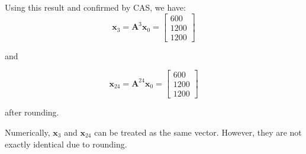\documentclass[12pt,a4paper]{article}
\begin{document}
\begin{solution}
Using this result and confirmed by CAS, we have:
\[
\mathbf{x}_3 = 
\mathbf{A}^3 \mathbf{x}_0 =  
\begin{bmatrix}
600 \\
1200 \\
1200
\end{bmatrix}
\]

and 

\[
\mathbf{x}_{24} =
\mathbf{A}^{24} \mathbf{x}_0 =  
\begin{bmatrix}
600 \\
1200 \\
1200
\end{bmatrix}
\]

after rounding.

\begin{remark}
    Numerically, $\mathbf{x}_3$ and $\mathbf{x}_{24}$ can be treated as the same vector. However, they are not exactly identical due to rounding.
\end{remark}    
\end{solution}
\end{document}
